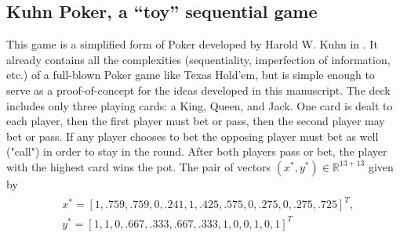 \documentclass[a4paper,9pt]{extarticle}
\begin{document}
\subsection{Kuhn Poker, a ``toy'' sequential game} This game is a
simplified form of Poker
developed by Harold W. Kuhn in \cite{kuhn}. It already contains all
the complexities (sequentiality, imperfection of information, etc.) of
a full-blown Poker game like Texas Hold'em, but is simple enough to
serve as a proof-of-concept for the ideas developed in this
manuscript. The deck includes only three playing
cards: a King, Queen, and Jack. One card is dealt to each player, then
the first player must bet or pass, then the second player may bet or
pass. If any player chooses
to bet the opposing player must bet as well ("call") in order to stay
in the round. After both players pass or bet, the player with the
highest card wins the pot. %
The pair of vectors $(x^*, y^*) \in \mathbb{R}^{13 + 13}$ given by
\begin{eqnarray*}
  \begin{split}
    &x^* = [1, .759, .759, 0, .241, 1, .425, .575, 0, .275, 0,
      .275, .725]^T,\\
    &y^* = [1, 1, 0, .667, .333, .667, .333, 1, 0, 0, 1, 0, 1]^T
    \end{split}
\end{eqnarray*}
\end{document}
